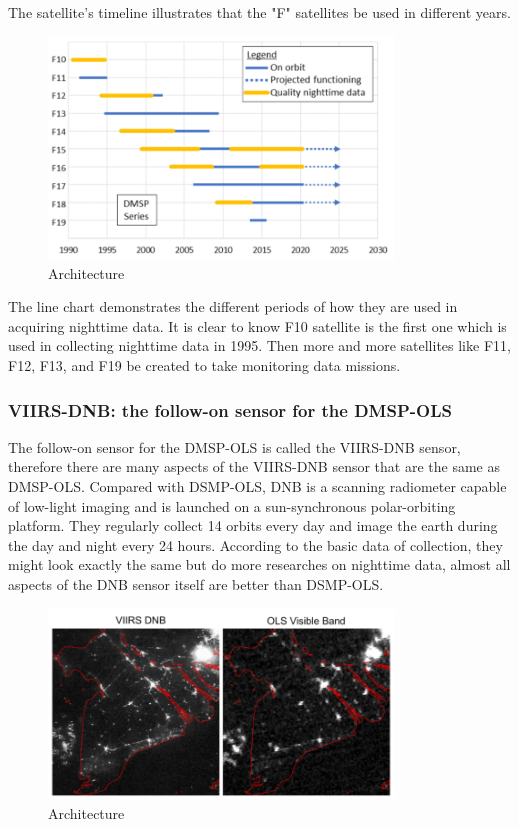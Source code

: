 \documentclass[conference]{IEEEtran}
\begin{document}
The satellite's timeline illustrates that the "F" satellites be used in different years.

	\begin{figure}[htbp]
	\centerline{\includegraphics[width=260pt]{images/2.1.png}}
	\caption{Architecture}
	\label{fig3}
\end{figure}

The line chart demonstrates the different periods of how they are used in acquiring nighttime data.  It is clear to know F10 satellite is the first one which is used in collecting nighttime data in 1995. Then more and more satellites like F11, F12, F13, and F19 be created to take monitoring data missions.

\subsubsection{VIIRS-DNB: the follow-on sensor for the DMSP-OLS}
The follow-on sensor for the DMSP-OLS is called the VIIRS-DNB sensor, therefore there are many aspects of the VIIRS-DNB sensor that are the same as DMSP-OLS. Compared with DSMP-OLS, DNB is a scanning radiometer capable of low-light imaging and is launched on a sun-synchronous polar-orbiting platform. They regularly collect 14 orbits every day and image the earth during the day and night every 24 hours. According to the basic data of collection, they might look exactly the same but do more researches on nighttime data, almost all aspects of the DNB sensor itself are better than DSMP-OLS.

	\begin{figure}[htbp]
	\centerline{\includegraphics[width=260pt]{images/3.png}}
	\caption{Architecture}
	\label{fig3}
\end{figure}
\end{document}
